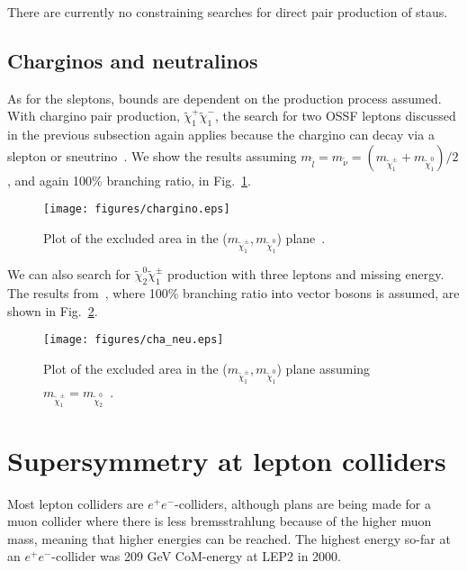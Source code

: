 \documentclass[notes.tex]{subfiles}
\begin{document}
There are currently no constraining searches for direct pair production of staus.

\subsection{Charginos and neutralinos}
As for the sleptons, bounds are dependent on the production process assumed. With chargino pair production, $\tilde\chi_1^+\tilde\chi_1^-$, the search for two OSSF leptons discussed in the previous subsection again applies because the chargino can decay via a slepton or sneutrino~\cite{ATLAS-CONF-2013-049}. We show the results assuming $m_{\tilde l}=m_{\tilde\nu} = (m_{\tilde\chi_1^\pm} +m_{\tilde\chi_1^0})/2$, and again 100\% branching ratio, in Fig.~\ref{fig:chargino}.

\begin{figure}[h!]
\begin{center}
\texttt{[image: figures/chargino.eps]} 
\caption{Plot of the excluded area in the ($m_{\tilde\chi_1^\pm}$,\,$m_{\tilde{\chi}^0_1}$) plane~\cite{ATLAS-CONF-2013-049}.\label{fig:chargino}}
\end{center}
\end{figure}

We can also search for $\tilde\chi_2^0\tilde\chi_1^\pm$ production with three leptons and missing energy. 
The results from~\cite{ATLAS-CONF-2013-035}, where 100\% branching ratio into vector bosons is assumed, are shown in Fig.~\ref{fig:cha_neu}.

\begin{figure}[h!]
\begin{center}
\texttt{[image: figures/cha\_neu.eps]} 
\caption{Plot of the excluded area in the ($m_{\tilde\chi_1^\pm}$,\,$m_{\tilde{\chi}^0_1}$) plane assuming $m_{\tilde\chi_1^\pm}=m_{\tilde\chi_2^0}$~\cite{ATLAS-CONF-2013-035}.\label{fig:cha_neu}}
\end{center}
\end{figure}



\section{Supersymmetry at lepton colliders}
Most lepton colliders are $e^+e^-$-colliders, although plans are being made for a muon collider where there is less bremsstrahlung because of the higher muon mass, meaning that higher energies can be reached. The highest energy so-far at an $e^+e^-$-collider was 209 GeV CoM-energy at LEP2 in 2000.
\end{document}
